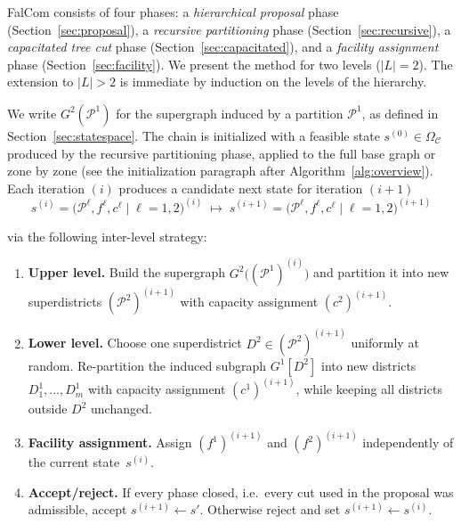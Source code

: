 \documentclass[11pt]{article}
\theoremstyle{definition}
\begin{document}
FalCom consists of four phases: a \emph{hierarchical proposal} phase (Section~\ref{sec:proposal}), a \emph{recursive partitioning} phase (Section~\ref{sec:recursive}), a \emph{capacitated tree cut} phase (Section~\ref{sec:capacitated}), and a \emph{facility assignment} phase (Section~\ref{sec:facility}). We present the method for two levels ($|L| = 2$). The extension to $|L| > 2$ is immediate by induction on the levels of the hierarchy.

We write $G^2(\mathcal{P}^1)$ for the supergraph induced by a partition $\mathcal{P}^1$, as defined in Section~\ref{sec:statespace}. The chain is initialized with a feasible state $s^{(0)} \in \Omega_\mathcal{C}$ produced by the recursive partitioning phase, applied to the full base graph or zone by zone (see the initialization paragraph after Algorithm~\ref{alg:overview}). Each iteration $(i)$ produces a candidate next state for iteration $(i+1)$
%
\[
    s^{(i)} = \bigl(\mathcal{P}^\ell, f^\ell, c^\ell
    \;\big|\; \ell=1,2)^{(i)}
    \;\longmapsto\;
    s^{(i+1)} = \bigl(\mathcal{P}^\ell, f^\ell, c^\ell
    \;\big|\; \ell=1,2)^{(i+1)}
\]
%

%
via the following inter-level strategy:
%
\medskip

\begin{enumerate}[nosep]
    \item \textbf{Upper level.} Build the supergraph
        $G^2\bigl((\mathcal{P}^1)^{(i)}\bigr)$ and partition it into new
        superdistricts $(\mathcal{P}^2)^{(i+1)}$ with capacity assignment
        $(c^2)^{(i+1)}$.
    \item \textbf{Lower level.} Choose one superdistrict
        $D^2 \in (\mathcal{P}^2)^{(i+1)}$ uniformly at random.
        Re-partition the induced subgraph $G^1[D^2]$ into new
        districts $D_1^1, \ldots, D_m^1$ with capacity assignment
        $(c^1)^{(i+1)}$, while keeping all districts outside $D^2$
        unchanged.
    \item \textbf{Facility assignment.} Assign $(f^1)^{(i+1)}$ and
        $(f^2)^{(i+1)}$ independently of the current state~$s^{(i)}$.
        \item \textbf{Accept/reject.} If every phase closed, i.e.\ every cut used in the proposal was admissible, accept $s^{(i+1)} \leftarrow s'$. Otherwise reject and set
        $s^{(i+1)} \leftarrow s^{(i)}$.
\end{enumerate}
\medskip
\end{document}
